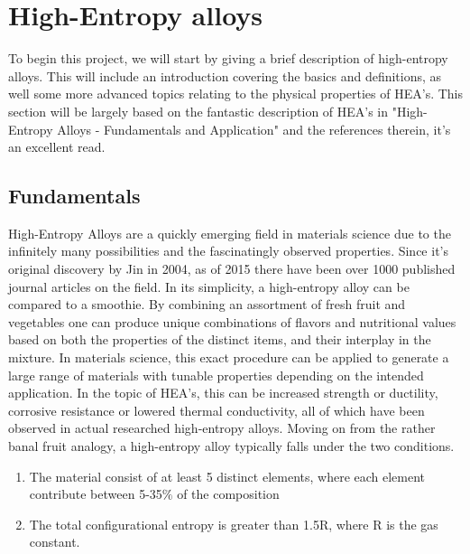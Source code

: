 \chapter{High-Entropy alloys}
\label{sec:HEA}

To begin this project, we will start by giving a brief description of high-entropy alloys. This will include an introduction covering the basics and definitions, as well some more advanced topics relating to the physical properties of HEA's. This section will be largely based on the fantastic description of HEA's in "High-Entropy Alloys - Fundamentals and Application" \cite{HEA2016} and the references therein, it's an excellent read.

\section{Fundamentals}
High-Entropy Alloys are a quickly emerging field in materials science due to the infinitely many possibilities and the fascinatingly observed properties. Since it's original discovery by Jin in 2004, as of 2015 there have been over 1000 published journal articles on the field. 
In its simplicity, a high-entropy alloy can be compared to a smoothie. By combining an assortment of fresh fruit and vegetables one can produce unique combinations of flavors and nutritional values based on both the properties of the distinct items, and their interplay in the mixture. In materials science, this exact procedure can be applied to generate a large range of materials with tunable properties depending on the intended application. In the topic of HEA's, this can be increased strength or ductility, corrosive resistance or lowered thermal conductivity, all of which have been observed in actual researched high-entropy alloys. 
Moving on from the rather banal fruit analogy, a high-entropy alloy typically falls under the two conditions.
\begin{enumerate}
    \item The material consist of at least 5 distinct elements, where each element contribute between 5-35$\%$ of the composition
    \item The total configurational entropy is greater than 1.5R, where R is the gas constant. 
\end{enumerate}
